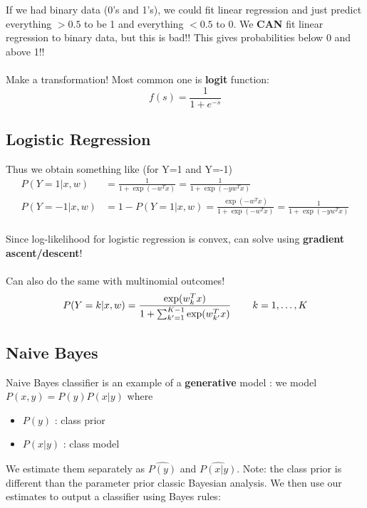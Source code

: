 \documentclass[a4paper]{article}\usepackage[]{graphicx}\usepackage[]{color}
\begin{document}
If we had binary data (0's and 1's), we could fit linear regression and just predict everything $>0.5$ to be 1 and everything $<0.5$ to 0. We \textbf{CAN} fit linear regression to binary data, but this is bad!! This gives probabilities below 0 and above 1!! \\
\\
Make a transformation! Most common one is \textbf{logit} function:
\begin{equation*}
f(s) = \frac{1}{1+e^{-s}}
\end{equation*}

\subsection{Logistic Regression}

Thus we obtain something like (for Y=1 and Y=-1)
\begin{align*}
P(Y=1|x,w) &= \frac{1}{1+\exp(-w^Tx)} = \frac{1}{1+\exp(-yw^Tx)} \\
P(Y=-1|x,w) &= 1-P(Y=1|x,w) = \frac{\exp(-w^Tx)}{1+\exp(-w^Tx)} = \frac{1}{1+\exp(-yw^Tx)} \\
\end{align*}

Since log-likelihood for logistic regression is convex, can solve using \textbf{gradient ascent/descent}! \\
\\
Can also do the same with multinomial outcomes!
\begin{align*}
P(Y=k|x,w) = \frac{\exp(w_k^T x)}{1+\sum_{k'=1}^{K-1} \exp(w_{k'}^T x)} \hspace{0.3in} k=1,\ldots,K
\end{align*}

\subsection{Naive Bayes}

Naive Bayes classifier is an example of a \textbf{generative} model : we model $P(x,y)=P(y)P(x|y)$ where
\begin{itemize}
\item $P(y)$ : class prior
\item $P(x|y)$ : class model
\end{itemize}

We estimate them separately as $\hat{P(y)}$ and $\hat{P(x|y)}$. Note: the class prior is different than the parameter prior classic Bayesian analysis. We then use our estimates to output a classifier using Bayes rules:
\end{document}
